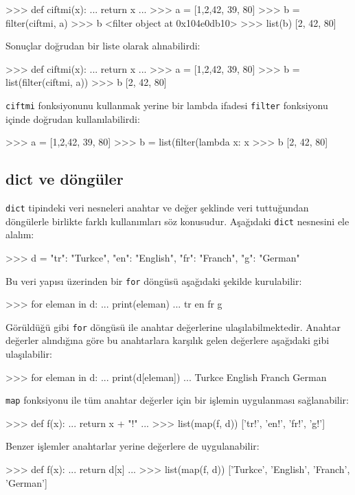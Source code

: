 \documentclass[12pt]{report}
\begin{document}
\begin{python}
>>> def ciftmi(x):
...     return x %
... 
>>> a = [1,2,42, 39, 80]
>>> b = filter(ciftmi, a)
>>> b
<filter object at 0x104e0db10>
>>> list(b)
[2, 42, 80]
\end{python}

Sonuçlar doğrudan bir liste olarak alınabilirdi:

\begin{python}
	>>> def ciftmi(x):
	...     return x %
	... 
	>>> a = [1,2,42, 39, 80]
	>>> b = list(filter(ciftmi, a))
	>>> b
	[2, 42, 80]
\end{python}

\texttt{ciftmi} fonksiyonunu kullanmak yerine bir lambda ifadesi \texttt{filter} fonksiyonu içinde doğrudan kullanılabilirdi:

\begin{python}
>>> a = [1,2,42, 39, 80]
>>> b = list(filter(lambda x: x %
>>> b
[2, 42, 80]
\end{python}

\subsection{dict ve döngüler}
\texttt{dict} tipindeki veri nesneleri anahtar ve değer şeklinde veri tuttuğundan döngülerle birlikte farklı kullanımları söz konusudur. Aşağıdaki \texttt{dict} nesnesini ele alalım:

\begin{python}
>>> d = {"tr": "Turkce", "en": "English", "fr": "Franch", "g": "German"}
\end{python}

Bu veri yapısı üzerinden bir \texttt{for} döngüsü aşağıdaki şekilde kurulabilir:

\begin{python}
>>> for eleman in d:
...     print(eleman)
... 
tr
en
fr
g
\end{python}

Görüldüğü gibi \texttt{for} döngüsü ile anahtar değerlerine ulaşılabilmektedir. Anahtar değerler alındığına göre bu anahtarlara karşılık gelen değerlere aşağıdaki gibi ulaşılabilir:

\begin{python}
>>> for eleman in d:
...     print(d[eleman])
... 
Turkce
English
Franch
German
\end{python}

\texttt{map} fonksiyonu ile tüm anahtar değerler için bir işlemin uygulanması sağlanabilir:

\begin{python}
>>> def f(x):
...     return x + "!"
... 
>>> list(map(f, d))
['tr!', 'en!', 'fr!', 'g!']
\end{python}

Benzer işlemler anahtarlar yerine değerlere de uygulanabilir:


\begin{python}
>>> def f(x):
...     return d[x]
... 
>>> list(map(f, d))
['Turkce', 'English', 'Franch', 'German']
\end{python}
\end{document}
